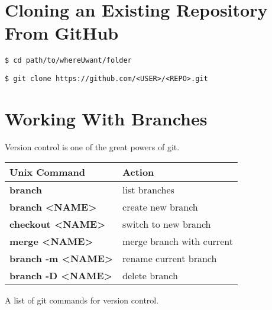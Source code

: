 \vspace{1cm}

\section{Cloning an Existing Repository From GitHub }


\begin{shaded}
\begin{verbatim}
$ cd path/to/whereUwant/folder
\end{verbatim}
\end{shaded}
\begin{shaded}
\begin{verbatim}
$ git clone https://github.com/<USER>/<REPO>.git
\end{verbatim}
\end{shaded}

\vspace{1cm}

\section{Working With Branches }
Version control is one of the great powers of git.

\begin{margintable}[80pt]
  \footnotesize%
  \begin{center}
    \begin{tabular}{ll}
      \toprule
     Unix Command & Action \\
      \midrule
     \bf{branch}  & list branches       \\
    \bf{branch} <NAME>  & create new branch        \\
    \bf{checkout} <NAME>  & switch to new branch        \\
     \bf{merge} <NAME>  & merge branch with current      \\
      \bf{branch -m} <NAME>  & rename current branch \\
      \bf{branch -D} <NAME>  & delete branch       \\
      \bottomrule
    \end{tabular}
  \end{center}
  \caption{A list of git commands for version control.}
  \label{tab:font-sizes}
\end{margintable}

